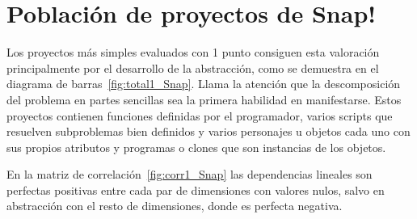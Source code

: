 \documentclass[a4paper, 12pt]{book}
\begin{document}
\section{Población de proyectos de Snap!}
\label{append_Snap}

Los proyectos más simples evaluados con 1 punto consiguen esta valoración principalmente por el desarrollo de la abstracción, como se demuestra en el diagrama de barras~\ref{fig:total1_Snap}. Llama la atención que la descomposición del problema en partes sencillas sea la primera habilidad en manifestarse. Estos proyectos contienen funciones definidas por el programador, varios scripts que resuelven subproblemas bien definidos y varios personajes u objetos cada uno con sus propios atributos y programas o clones que son instancias de los objetos. 

En la matriz de correlación~\ref{fig:corr1_Snap} las dependencias lineales son perfectas positivas entre cada par de dimensiones con valores nulos, salvo en abstracción con el resto de dimensiones, donde es perfecta negativa.
\end{document}
